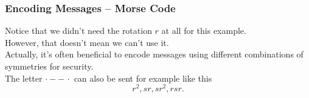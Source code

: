 \documentclass[aspectratio=169,11pt,svgnames,draft]{beamer}
\begin{document}
\begin{frame}
 \frametitle{Encoding Messages -- Morse Code}
 Notice that we didn't need the rotation $r$ at all for this example.\\
 \pause
 However, that doesn't mean we \alert{can't} use it.\\
 \pause
 Actually, it's often beneficial to encode messages using different combinations
 of symmetries for security.\\
 \pause
 The letter $ \cdot - - \, \cdot $ can also be sent for example like this
 \[
  r^2,sr,s r^2,rs r.
 \]
 
\end{frame}
\end{document}
